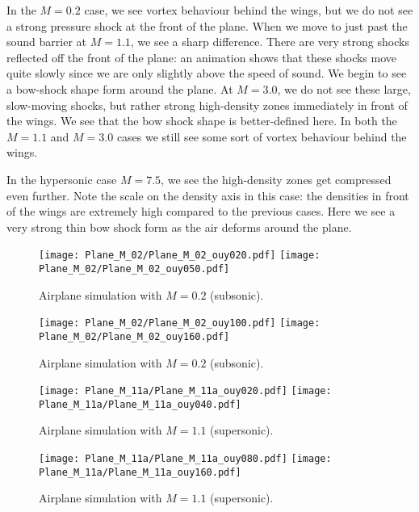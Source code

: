 \documentclass[twocolumn]{myarticle}
\numberwithin{equation}{section}
\begin{document}
In the $ M = 0.2 $ case, we see vortex behaviour behind the wings, but we do not see a strong pressure shock at the front of the plane.
When we move to just past the sound barrier at $ M = 1.1 $, we see a sharp difference.
There are very strong shocks reflected off the front of the plane: an animation shows that these shocks move quite slowly since we are only slightly above the speed of sound.
We begin to see a bow-shock shape form around the plane.
At $ M = 3.0 $, we do not see these large, slow-moving shocks, but rather strong high-density zones immediately in front of the wings.
We see that the bow shock shape is better-defined here.
In both the $ M = 1.1 $ and $ M = 3.0 $ cases we still see some sort of vortex behaviour behind the wings.

In the hypersonic case $ M = 7.5 $, we see the high-density zones get compressed even further.
Note the scale on the density axis in this case: the densities in front of the wings are extremely high compared to the previous cases.
Here we see a very strong thin bow shock form as the air deforms around the plane.

\begin{figure*}[ht]
    \centering
    \texttt{[image: Plane\_M\_02/Plane\_M\_02\_ouy020.pdf]}
    \texttt{[image: Plane\_M\_02/Plane\_M\_02\_ouy050.pdf]}
    \caption{Airplane simulation with $ M = 0.2 $ (subsonic).}
    \label{fig:plane1a}
\end{figure*}

\begin{figure*}[ht]
    \centering
    \texttt{[image: Plane\_M\_02/Plane\_M\_02\_ouy100.pdf]}
    \texttt{[image: Plane\_M\_02/Plane\_M\_02\_ouy160.pdf]}
    \caption{Airplane simulation with $ M = 0.2 $ (subsonic).}
    \label{fig:plane1b}
\end{figure*}


\begin{figure*}[ht]
    \centering
    \texttt{[image: Plane\_M\_11a/Plane\_M\_11a\_ouy020.pdf]}
    \texttt{[image: Plane\_M\_11a/Plane\_M\_11a\_ouy040.pdf]}
    \caption{Airplane simulation with $ M = 1.1 $ (supersonic).}
    \label{fig:plane2a}
\end{figure*}

\begin{figure*}[ht]
    \centering
    \texttt{[image: Plane\_M\_11a/Plane\_M\_11a\_ouy080.pdf]}
    \texttt{[image: Plane\_M\_11a/Plane\_M\_11a\_ouy160.pdf]}
    \caption{Airplane simulation with $ M = 1.1 $ (supersonic).}
    \label{fig:plane2b}
\end{figure*}
\end{document}
